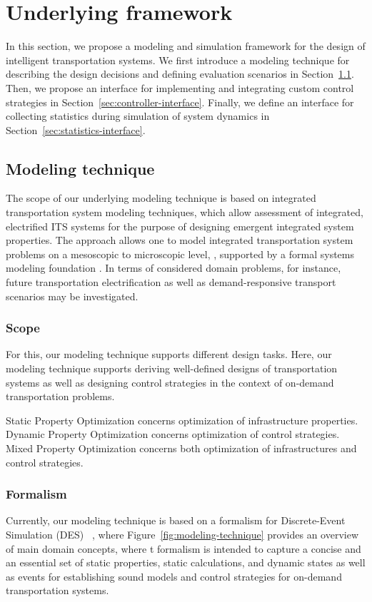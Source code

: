\documentclass[10pt,twocolumn]{article}
\begin{document}
\section{Underlying framework}
\label{sec:framework}

In this section, we propose a modeling and simulation framework for the design of intelligent transportation systems.
We first introduce a modeling technique for describing the design decisions and defining evaluation scenarios in Section~\ref{sec:modeling-technique}.
Then, we propose an interface for implementing and integrating custom control strategies in Section~\ref{sec:controller-interface}.
Finally, we define an interface for collecting statistics during simulation of system dynamics in Section~\ref{sec:statistics-interface}.

\subsection{Modeling technique}
\label{sec:modeling-technique}
The scope of our underlying modeling technique is based on integrated transportation system modeling techniques, which allow assessment of integrated, electrified ITS systems for the purpose of designing emergent  integrated system properties. The approach allows one to model integrated transportation system problems on a mesoscopic to microscopic level, \cite{ascher_hackenberg_2014, ascher_hackenberg_2015}, supported by a formal systems modeling foundation \cite{ascher_hackenberg_2016, ascher_hackenberg_2017}. In terms of considered domain problems, for instance, future transportation electrification as well as demand-responsive transport scenarios may be investigated.

\subsubsection{Scope}
For this, our modeling technique supports different design tasks. Here, our modeling technique supports deriving well-defined designs of transportation systems as well as designing control strategies in the context of on-demand transportation problems.

Static Property Optimization concerns optimization of infrastructure properties.
Dynamic Property Optimization concerns optimization of control strategies.
Mixed Property Optimization concerns both optimization of infrastructures and control strategies. 

\subsubsection{Formalism}
Currently, our modeling technique is based on a formalism for Discrete-Event Simulation (DES) ~\cite{fishman2001discrete}, where Figure~\ref{fig:modeling-technique} provides an overview of main domain concepts, where t formalism is intended to capture a concise and an essential set of static properties, static calculations, and dynamic states as well as events for establishing sound models and control strategies for on-demand transportation systems.
\end{document}
